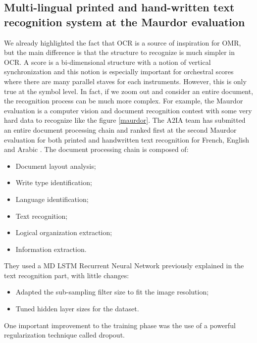 \documentclass[11pt]{sdm}
\begin{document}
\subsection{Multi-lingual printed and hand-written text recognition system at the Maurdor evaluation} \label{ssec:maurdor}

We already highlighted the fact that OCR is a source of inspiration for OMR, but the main difference is that the structure to recognize is much simpler in OCR.
A score is a bi-dimensional structure with a notion of vertical synchronization and this notion is especially important for orchestral scores where there are many parallel staves for each instruments.
However, this is only true at the symbol level.
In fact, if we zoom out and consider an entire document, the recognition process can be much more complex.
For example, the Maurdor evaluation \cite{_maurdor_2016} is a computer vision and document recognition contest with some very hard data to recognize like the figure \ref{maurdor}.
The A2IA team has submitted an entire document processing chain and ranked first at the second Maurdor evaluation for both printed and handwritten text recognition for French, English and Arabic \cite{moysset_a2ia_2014}.
The document processing chain is composed of:
\begin{itemize}
  \item Document layout analysis;
  \item Write type identification;
  \item Language identification;
  \item Text recognition;
  \item Logical organization extraction;
  \item Information extraction.
\end{itemize}
They used a MD LSTM Recurrent Neural Network previously explained in the text recognition part, with little changes:
\begin{itemize}
  \item Adapted the sub-sampling filter size to fit the image resolution;
  \item Tuned hidden layer sizes for the dataset.
\end{itemize}
One important improvement to the training phase was the use of a powerful regularization technique called dropout.
\end{document}
